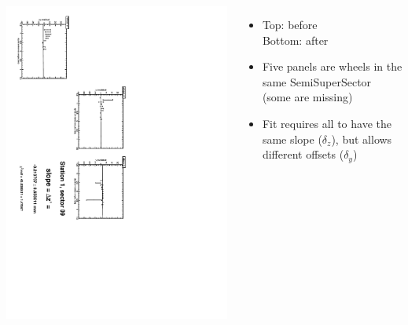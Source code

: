 \documentclass[compress]{beamer}
\begin{document}
\begin{frame}
\begin{columns}
\vfill
\includegraphics[height=\linewidth, angle=90]{zfits_after/zfit_1_09.pdf}
\begin{itemize}
\item Top: before \\ Bottom: after
\item Five panels are wheels in the same SemiSuperSector (some are missing)
\item Fit requires all to have the same slope ($\delta_z$), but allows different offsets ($\delta_y$)
\end{itemize}
\end{columns}
\end{frame}
\end{document}
